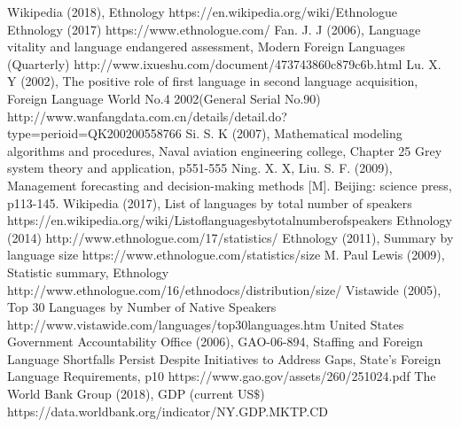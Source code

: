 \documentclass{mcmthesis}
\begin{document}
\begin{thebibliography}{99}
 Wikipedia (2018), Ethnology
https://en.wikipedia.org/wiki/Ethnologue
Ethnology (2017)
https://www.ethnologue.com/
Fan. J. J (2006), Language vitality and language endangered assessment, Modern Foreign Languages (Quarterly)
http://www.ixueshu.com/document/473743860c879c6b.html
Lu. X. Y (2002), The positive role of first language in second language acquisition, Foreign Language World No.4 2002(General Serial No.90)
http://www.wanfangdata.com.cn/details/detail.do?type=perioid=QK200200558766
 Si. S. K (2007), Mathematical modeling algorithms and procedures, Naval aviation engineering college, Chapter 25 Grey system theory and application, p551-555
Ning. X. X, Liu. S. F. (2009), Management forecasting and decision-making methods [M]. Beijing: science press, p113-145.
Wikipedia (2017), List of languages by total number of speakers
https://en.wikipedia.org/wiki/Listoflanguagesbytotalnumberofspeakers
 Ethnology (2014)
http://www.ethnologue.com/17/statistics/
 Ethnology (2011), Summary by language size
https://www.ethnologue.com/statistics/size
 M. Paul Lewis (2009), Statistic summary, Ethnology
http://www.ethnologue.com/16/ethnodocs/distribution/size/
 Vistawide (2005), Top 30 Languages by Number of Native Speakers
 http://www.vistawide.com/languages/top30languages.htm
 United States Government Accountability Office (2006), GAO-06-894, Staffing and Foreign Language Shortfalls Persist Despite Initiatives to Address Gaps, State’s Foreign Language Requirements, p10
https://www.gao.gov/assets/260/251024.pdf
 The World Bank Group (2018), GDP (current US$\$$)
https://data.worldbank.org/indicator/NY.GDP.MKTP.CD
\end{thebibliography}
\end{document}
